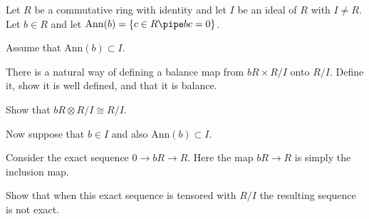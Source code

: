 Let $R$ be a commutative ring with identity and let $I$ be an ideal of
$R$ with $I\neq R$. Let $b\in R$ and let $\mathrm{Ann}(b)=\{c\in
R\pipe bc=0\}$.

Assume that $\mathrm{Ann}(b)\subset I$.

\begin{alist}
\item There is a natural way of defining a balance map from
$bR\times R/I$ onto $R/I$. Define it, show it is well defined, and
that it is balance.
\item Show that $bR\otimes R/I\cong R/I$.
\item Now suppose that $b\in I$ and also $\mathrm{Ann}(b)\subset I$.

Consider the exact sequence $0\rightarrow bR\rightarrow R$. Here the
map $bR\rightarrow R$ is simply the inclusion map.

Show that when this exact sequence is tensored with $R/I$ the
resulting sequence is not exact.
\end{alist}
